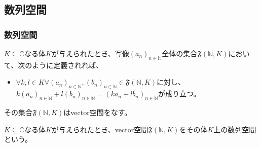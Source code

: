 \documentclass[dvipdfmx]{jsarticle}
\begin{document}
\subsection{数列空間}%
\subsubsection{数列空間}%
\begin{thm}\label{2.3.3.1}
$K \subseteq \mathbb{C}$なる体$K$が与えられたとき、写像$\left( a_{n} \right)_{n \in \mathbb{N}}$全体の集合$\mathfrak{F}\left( \mathbb{N},K \right)$において、次のように定義されれば、
\begin{itemize}
\item
  $\forall k,l \in K\forall\left( a_{n} \right)_{n \in \mathbb{N}},\left( b_{n} \right)_{n \in \mathbb{N}}\in \mathfrak{F}\left( \mathbb{N},K \right)$に対し、$k\left( a_{n} \right)_{n \in \mathbb{N}} + l\left( b_{n} \right)_{n \in \mathbb{N}} = \left( ka_{n} + lb_{n} \right)_{n \in \mathbb{N}}$が成り立つ。
\end{itemize}
その集合$\mathfrak{F}\left( \mathbb{N},K \right)$はvector空間をなす。
\end{thm}
\begin{dfn}
$K \subseteq \mathbb{C}$なる体$K$が与えられたとき、vector空間$\mathfrak{F}\left( \mathbb{N},K \right)$をその体$K$上の数列空間という。
\end{dfn}
\end{document}
